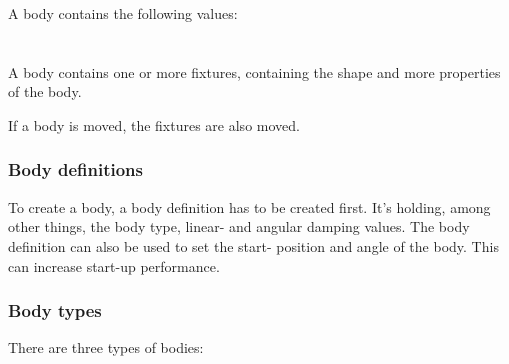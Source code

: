 \documentclass[10pt,a4paper,DIV=11]{scrreprt}
\begin{document}
A body contains the following values: \\

   \\
\\



A body contains one or more fixtures, containing the shape and more properties of the body.

If a body is moved, the fixtures are also moved.

\subsubsection*{Body definitions}
To create a body, a body definition has to be created first. It's holding, among other things, the body type, linear- and angular damping values.
The body definition can also be used to set the start- position and angle of the body. This can increase start-up performance.

\subsubsection*{Body types}
There are three types of bodies:

   \\
\\
\end{document}
